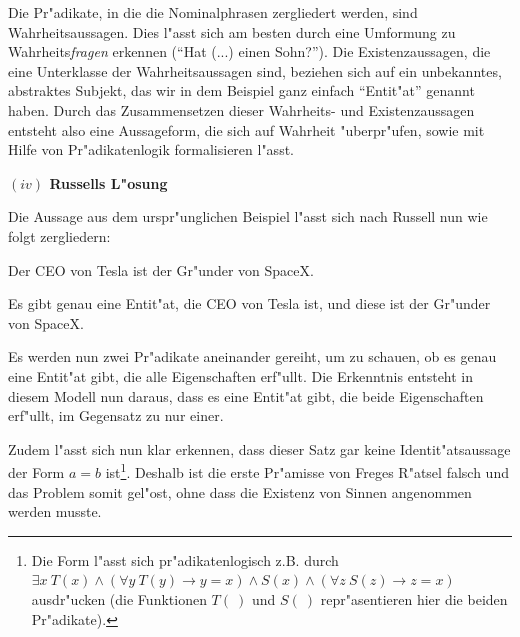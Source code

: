 \documentclass[a4paper, emulatestandardclasses, 12pt]{scrartcl}
\begin{document}
\begin{onehalfspace}
Die Pr"adikate, in die die Nominalphrasen zergliedert werden, sind Wahrheitsaussagen. Dies l"asst sich am besten durch eine Umformung zu Wahrheits\emph{fragen} erkennen ("`Hat (...) einen Sohn?"'). Die Existenzaussagen, die eine Unterklasse der Wahrheitsaussagen sind, beziehen sich auf ein unbekanntes, abstraktes Subjekt, das wir in dem Beispiel ganz einfach "`Entit"at"' genannt haben. Durch das Zusammensetzen dieser Wahrheits- und Existenzaussagen entsteht also eine Aussageform, die sich auf Wahrheit "uberpr"ufen, sowie mit Hilfe von Pr"adikatenlogik formalisieren l"asst.

\vspace{3mm}

\noindent\textbf{$(iv)$ Russells L"osung}

\noindent Die Aussage aus dem urspr"unglichen Beispiel l"asst sich nach Russell nun wie folgt zergliedern:

\begin{description}[leftmargin=!,labelwidth=\widthof{\bfseries Zergliederung}]
    \item[Originalsatz] Der CEO von Tesla ist der Gr"under von SpaceX.
    \item[Zergliederung] Es gibt genau eine Entit"at, die CEO von Tesla ist, und diese ist der Gr"under von SpaceX. 
\end{description}

Es werden nun zwei Pr"adikate aneinander gereiht, um zu schauen, ob es genau eine Entit"at gibt, die alle Eigenschaften erf"ullt. Die Erkenntnis entsteht in diesem Modell nun daraus, dass es eine Entit"at gibt, die beide Eigenschaften erf"ullt, im Gegensatz zu nur einer.  

Zudem l"asst sich nun klar erkennen, dass dieser Satz gar keine Identit"atsaussage der Form $a = b$ ist\footnote{Die Form l"asst sich pr"adikatenlogisch z.B. durch $\exists x~T(x) \wedge (\forall y~T(y) \rightarrow y = x) \wedge S(x) \wedge (\forall z~S(z) \rightarrow z = x)$ ausdr"ucken (die Funktionen $T(~)$ und $S(~)$ repr"asentieren hier die beiden Pr"adikate).}. Deshalb ist die erste Pr"amisse von Freges R"atsel falsch und das Problem somit gel"ost, ohne dass die Existenz von Sinnen angenommen werden musste. 



\vspace{3mm}




\end{onehalfspace}


\end{document}
